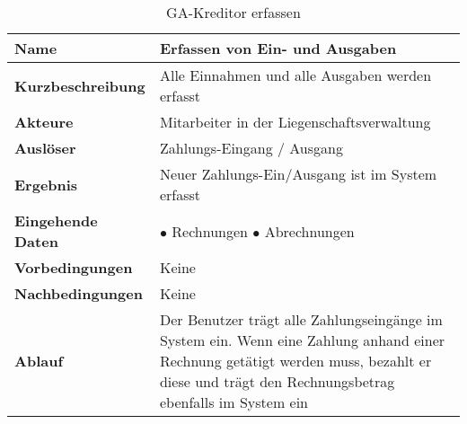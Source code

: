 \begin{table}[H]
  \centering
  \settowidth{}
  \setlength\extrarowheight{2pt}
  \begin{tabulary}{1.0\textwidth}{|a|m{12cm}|}
    \hline
    \textbf{Name}& Erfassen von Ein- und Ausgaben\\
    \hline 
    \textbf{Kurzbeschreibung} & Alle Einnahmen und alle Ausgaben werden erfasst\\
    \hline
    \textbf{Akteure} & Mitarbeiter in der Liegenschaftsverwaltung\\
    \hline
    \textbf{Auslöser} & Zahlungs-Eingang / Ausgang\\
    \hline
    \textbf{Ergebnis} & Neuer Zahlungs-Ein/Ausgang ist im System erfasst\\
    \hline
    \textbf{Eingehende Daten} &
      $\bullet$ Rechnungen \newline
      $\bullet$ Abrechnungen\\
    \hline
    \textbf{Vorbedingungen} & Keine\\
    \hline
    \textbf{Nachbedingungen} & Keine\\
    \hline
    \textbf{Ablauf} & Der Benutzer trägt alle Zahlungseingänge im System ein. Wenn eine Zahlung anhand einer Rechnung getätigt werden muss, bezahlt er diese und trägt den Rechnungsbetrag ebenfalls im System ein\\
    \hline
  \end{tabulary}
  \caption{GA-Kreditor erfassen}
\end{table}


